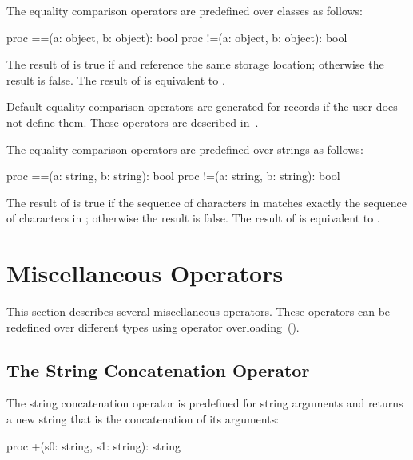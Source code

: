 The equality comparison operators are predefined over classes as
follows:
\begin{chapel}
proc ==(a: object, b: object): bool
proc !=(a: object, b: object): bool
\end{chapel}
The result of  is true if  and  reference
the same storage location; otherwise the result is false.  The result
of  is equivalent to .

Default equality comparison operators are generated for records if the
user does not define them.  These operators are described
in~.

The equality comparison operators are predefined over strings as
follows:
\begin{chapel}
proc ==(a: string, b: string): bool
proc !=(a: string, b: string): bool
\end{chapel}
The result of  is true if the sequence of characters
in  matches exactly the sequence of characters in ;
otherwise the result is false.  The result of  is
equivalent to .

\section{Miscellaneous Operators}
\label{Miscellaneous_Operators}

This section describes several miscellaneous operators.  These
operators can be redefined over different types using operator
overloading~().

\subsection{The String Concatenation Operator}
\label{The_String_Concatenation_Operator}

The string concatenation operator \chpl{+} is predefined for string
arguments and returns a new string that is the concatenation of its
arguments:

\begin{chapel}
proc +(s0: string, s1: string): string
\end{chapel}

